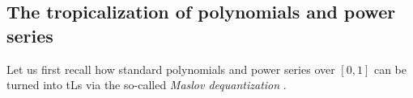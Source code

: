 


\subsection{The tropicalization of polynomials and power series}

%

Let us first recall how standard polynomials and power series over $[0,1]$ can be turned into tLs via the so-called \emph{Maslov dequantization} \cite{Litvinov2007}.
%

